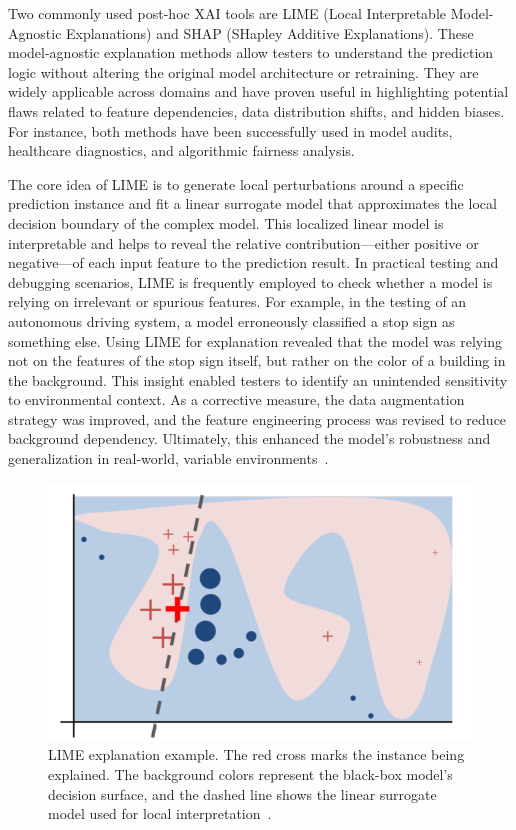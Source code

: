\documentclass[manuscript,screen,review]{acmart}
\begin{document}
Two commonly used post-hoc XAI tools are LIME (Local Interpretable Model-Agnostic Explanations) and SHAP (SHapley Additive Explanations). These model-agnostic explanation methods allow testers to understand the prediction logic without altering the original model architecture or retraining. They are widely applicable across domains and have proven useful in highlighting potential flaws related to feature dependencies, data distribution shifts, and hidden biases. For instance, both methods have been successfully used in model audits, healthcare diagnostics, and algorithmic fairness analysis.

The core idea of LIME is to generate local perturbations around a specific prediction instance and fit a linear surrogate model that approximates the local decision boundary of the complex model. This localized linear model is interpretable and helps to reveal the relative contribution—either positive or negative—of each input feature to the prediction result. In practical testing and debugging scenarios, LIME is frequently employed to check whether a model is relying on irrelevant or spurious features. For example, in the testing of an autonomous driving system, a model erroneously classified a stop sign as something else. Using LIME for explanation revealed that the model was relying not on the features of the stop sign itself, but rather on the color of a building in the background. This insight enabled testers to identify an unintended sensitivity to environmental context. As a corrective measure, the data augmentation strategy was improved, and the feature engineering process was revised to reduce background dependency. Ultimately, this enhanced the model’s robustness and generalization in real-world, variable environments~\cite{Ribeiro2016}.

\begin{figure}[htbp]
  \centering
  \includegraphics[width=0.6\linewidth]{picture/5.2fig1.png}
  \caption{LIME explanation example. The red cross marks the instance being explained. The background colors represent the black-box model’s decision surface, and the dashed line shows the linear surrogate model used for local interpretation~\cite{Ribeiro2016}.}
  \label{fig:lime}
\end{figure}
\end{document}
